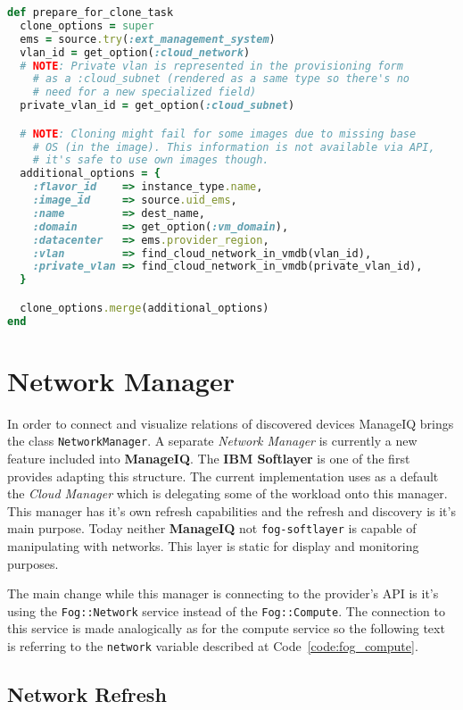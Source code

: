 \begin{lstlisting}[language=Ruby,caption={Prepare cloning options},label=code:cloning,float=htpb]
def prepare_for_clone_task
  clone_options = super
  ems = source.try(:ext_management_system)
  vlan_id = get_option(:cloud_network)
  # NOTE: Private vlan is represented in the provisioning form
	# as a :cloud_subnet (rendered as a same type so there's no
	# need for a new specialized field)
  private_vlan_id = get_option(:cloud_subnet)

  # NOTE: Cloning might fail for some images due to missing base
	# OS (in the image). This information is not available via API,
	# it's safe to use own images though.
  additional_options = {
    :flavor_id    => instance_type.name,
    :image_id     => source.uid_ems,
    :name         => dest_name,
    :domain       => get_option(:vm_domain),
    :datacenter   => ems.provider_region,
    :vlan         => find_cloud_network_in_vmdb(vlan_id),
    :private_vlan => find_cloud_network_in_vmdb(private_vlan_id),
  }

  clone_options.merge(additional_options)
end
\end{lstlisting}

\clearpage
\section{Network Manager}
\label{sec:Network Manager}

In order to connect and visualize relations of discovered devices ManageIQ brings the class \verb|NetworkManager|. A separate \emph{Network Manager} is currently a new feature included into \textbf{ManageIQ}. The \textbf{IBM Softlayer} is one of the first provides adapting this structure. The current implementation uses as a default the \emph{Cloud Manager} which is delegating some of the workload onto this manager. This manager has it's own refresh capabilities and the refresh and discovery is it's main purpose. Today neither \textbf{ManageIQ} not \texttt{fog-softlayer} is capable of manipulating with networks. This layer is static for display and monitoring purposes.

The main change while this manager is connecting to the provider's API is it's using the \verb|Fog::Network| service instead of the \verb|Fog::Compute|. The connection to this service is made analogically as for the compute service so the following text is referring to the \verb|network| variable described at Code~\ref{code:fog_compute}.

\subsection{Network Refresh}
\label{sub:Network Refresh}

